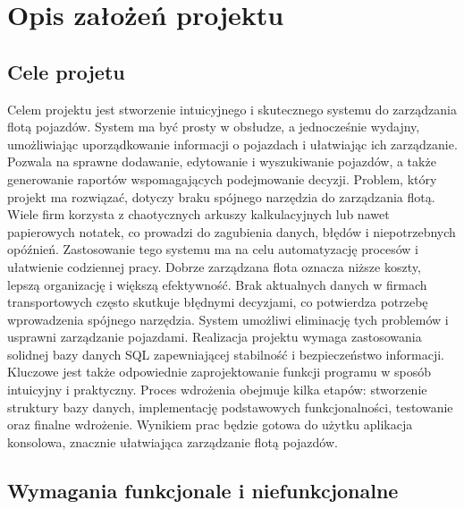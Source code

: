 \chapter{Opis założeń projektu}
\section{Cele projetu}

Celem projektu jest stworzenie intuicyjnego i skutecznego systemu do zarządzania flotą pojazdów. System ma być prosty w obsłudze, a jednocześnie wydajny, umożliwiając uporządkowanie informacji o pojazdach i ułatwiając ich zarządzanie. Pozwala na sprawne dodawanie, edytowanie i wyszukiwanie pojazdów, a także generowanie raportów wspomagających podejmowanie decyzji.
Problem, który projekt ma rozwiązać, dotyczy braku spójnego narzędzia do zarządzania flotą. Wiele firm korzysta z chaotycznych arkuszy kalkulacyjnych lub nawet papierowych notatek, co prowadzi do zagubienia danych, błędów i niepotrzebnych opóźnień. Zastosowanie tego systemu ma na celu automatyzację procesów i ułatwienie codziennej pracy.
Dobrze zarządzana flota oznacza niższe koszty, lepszą organizację i większą efektywność. Brak aktualnych danych w firmach transportowych często skutkuje błędnymi decyzjami, co potwierdza potrzebę wprowadzenia spójnego narzędzia. System umożliwi eliminację tych problemów i usprawni zarządzanie pojazdami.
Realizacja projektu wymaga zastosowania solidnej bazy danych SQL zapewniającej stabilność i bezpieczeństwo informacji. Kluczowe jest także odpowiednie zaprojektowanie funkcji programu w sposób intuicyjny i praktyczny. Proces wdrożenia obejmuje kilka etapów: stworzenie struktury bazy danych, implementację podstawowych funkcjonalności, testowanie oraz finalne wdrożenie. Wynikiem prac będzie gotowa do użytku aplikacja konsolowa, znacznie ułatwiająca zarządzanie flotą pojazdów.

\section{Wymagania funkcjonale i niefunkcjonalne}

